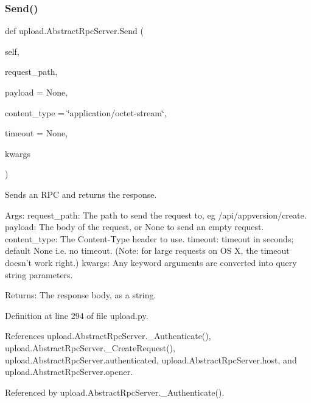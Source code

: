 \subsubsection{\texorpdfstring{Send()}{Send()}\hspace{0.1cm}{\footnotesize\ttfamily [1/2]}}
{\footnotesize\ttfamily def upload.\+Abstract\+Rpc\+Server.\+Send (\begin{DoxyParamCaption}\item[{}]{self,  }\item[{}]{request\+\_\+path,  }\item[{}]{payload = {\ttfamily None},  }\item[{}]{content\+\_\+type = {\ttfamily \char`\"{}application/octet-\/stream\char`\"{}},  }\item[{}]{timeout = {\ttfamily None},  }\item[{}]{kwargs }\end{DoxyParamCaption})}

\begin{DoxyVerb}Sends an RPC and returns the response.

Args:
  request_path: The path to send the request to, eg /api/appversion/create.
  payload: The body of the request, or None to send an empty request.
  content_type: The Content-Type header to use.
  timeout: timeout in seconds; default None i.e. no timeout.
(Note: for large requests on OS X, the timeout doesn't work right.)
  kwargs: Any keyword arguments are converted into query string parameters.

Returns:
  The response body, as a string.
\end{DoxyVerb}
 

Definition at line 294 of file upload.\+py.



References upload.\+Abstract\+Rpc\+Server.\+\_\+\+Authenticate(), upload.\+Abstract\+Rpc\+Server.\+\_\+\+Create\+Request(), upload.\+Abstract\+Rpc\+Server.\+authenticated, upload.\+Abstract\+Rpc\+Server.\+host, and upload.\+Abstract\+Rpc\+Server.\+opener.



Referenced by upload.\+Abstract\+Rpc\+Server.\+\_\+\+Authenticate().


